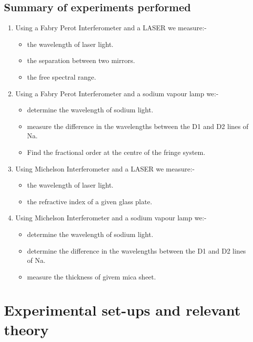 \documentclass[12pt]{report}
\begin{document}
	\section{Summary of experiments performed}
	\begin{enumerate}
		\item Using a Fabry Perot Interferometer and a LASER we measure:-
		\begin{itemize}
			\item the wavelength of laser light.
			\item the separation between two mirrors.
			\item the free spectral range.
		\end{itemize}
		\item Using a Fabry Perot Interferometer and a sodium vapour lamp we:-
		\begin{itemize}
			\item determine the wavelength of sodium light.
			\item measure the difference in the wavelengths between the D1 and D2 lines of Na.
			\item Find the fractional order at the centre of the fringe system.
		\end{itemize}
		\item Using Michelson Interferometer and a LASER we measure:-
		\begin{itemize}
			\item the wavelength of laser light. 
			\item the refractive index of a given glass plate.
		\end{itemize}
		\item Using Michelson Interferometer and a sodium vapour lamp we:-
		\begin{itemize}
			\item determine the wavelength of sodium light.
			\item determine the difference in the wavelengths between the D1 and D2 lines of Na.
			\item measure the thickness of givem mica sheet.
		\end{itemize}
	\end{enumerate}
	
	\chapter{Experimental set-ups and relevant theory}
\end{document}
